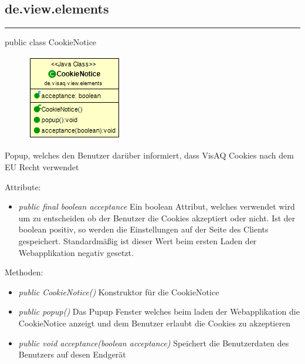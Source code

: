 \subsection{de.view.elements}

\rule{\textwidth}{0.4pt} 
public class CookieNotice

\begin{minipage}{0.3\textwidth}
    \begin{figure}[H]
        \includegraphics[scale = 0.6]{media/frontend/view/de.view.elements/CookieNotice_Class.png}
    \end{figure}
    \end{minipage} \hfill
    \begin{minipage}{0.6\textwidth}
Popup, welches den Benutzer darüber informiert, dass VisAQ Cookies nach dem EU Recht verwendet
\end{minipage}

Attribute:
\begin{itemize} 
    \item \emph{public final boolean acceptance} Ein boolean Attribut, welches verwendet wird um zu entscheiden ob der Benutzer die Cookies akzeptiert oder nicht. Ist der boolean positiv, so werden die Einstellungen auf der Seite des Clients gespeichert. Standardmäßig ist dieser Wert beim ersten Laden der Webapplikation negativ gesetzt.
\end{itemize}
Methoden:
\begin{itemize} 
    \item \emph{public CookieNotice()} Konstruktor für die CookieNotice 
    \item \emph{public popup()} Das Pupup Fenster welches beim laden der Webapplikation die CookieNotice anzeigt und dem Benutzer erlaubt die Cookies zu akzeptieren
    \item \emph{public void acceptance(boolean acceptance)} Speichert die Benutzerdaten des Benutzers auf desen Endgerät
\end{itemize}
